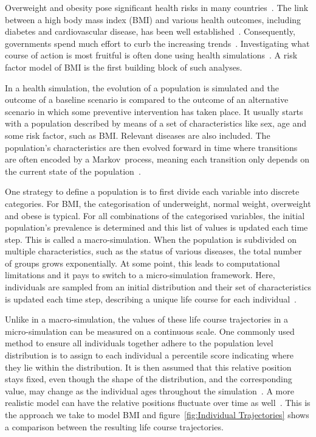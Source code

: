 \documentclass{imammb}
\numberwithin{equation}{section}
\begin{document}
Overweight and obesity pose significant health risks in many countries~\citep{Dai2020}. The link between a high body mass index (BMI) and various health outcomes, including diabetes and cardiovascular disease, has been well established~\citep{Murray2020}. Consequently, governments spend much effort to curb the increasing trends~\citep{VWS2018, VanRinsum2018}. Investigating what course of action is most fruitful is often done using health simulations~\citep{Levy2011}. A risk factor model of BMI is the first building block of such analyses.

In a health simulation, the evolution of a population is simulated and the outcome of a baseline scenario is compared to the outcome of an alternative scenario in which some preventive intervention has taken place. It usually starts with a population described by means of a set of characteristics like sex, age and some risk factor, such as BMI. Relevant diseases are also included. The population's characteristics are then evolved forward in time where transitions are often encoded by a \mbox{Markov process}, meaning each transition only depends on the current state of the population~\citep{Sonnenberg1993}.

One strategy to define a population is to first divide each variable into discrete categories. For BMI, the categorisation of underweight, normal weight, overweight and obese is typical. For all combinations of the categorised variables, the initial population's prevalence is determined and this list of values is updated each time step. This is called a macro-simulation. When the population is subdivided on multiple characteristics, such as the status of various diseases, the total number of groups grows exponentially. At some point, this leads to computational limitations and it pays to switch to a micro-simulation framework. Here, individuals are sampled from an initial distribution and their set of characteristics is updated each time step, describing a unique life course for each individual~\citep{Levy2011}.

Unlike in a macro-simulation, the values of these life course trajectories in a micro-simulation can be measured on a continuous scale. One commonly used method to ensure all individuals together adhere to the population level distribution is to assign to each individual a percentile score indicating where they lie within the distribution. It is then assumed that this relative position stays fixed, even though the shape of the distribution, and the corresponding value, may change as the individual ages throughout the simulation~\citep{McPherson2007, OECD2019}. A more realistic model can have the relative positions fluctuate over time as well~\citep{Vuik2021}. This is the approach we take to model BMI and figure~\ref{fig:Individual Trajectories} shows a comparison between the resulting life course trajectories.
\end{document}
